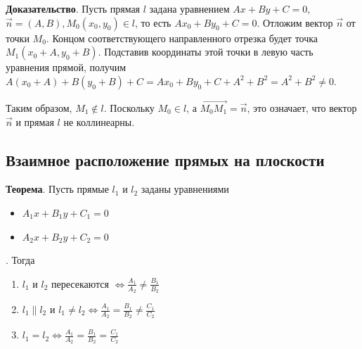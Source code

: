 \documentclass[a4paper]{article}
\begin{document}
\begin{hproof}
\textbf{Доказательство}. Пусть прямая $l$ задана уравнением $Ax + By + C = 0$, $\vec{n} = (A, B), M_0 (x_0, y_0) \in l$, то есть $Ax_0 + By_0 + C = 0$. Отложим вектор $\vec{n}$ от точки $M_0$. Концом соответствующего направленного отрезка будет точка $M_1(x_0 + A, y_0 + B)$. Подставив координаты этой точки в левую часть уравнения прямой, получим $A (x_0 + A) + B(y_0 + B) + C = Ax_0 + By_0 + C + A^2 + B^2 = A^2 + B^2 \neq 0$.

Таким образом, $M_1 \notin l$. Поскольку $M_0 \in l$, а $\overrightarrow{M_0 M_1} = \vec{n}$, это означает, что вектор $\vec{n}$ и прямая $l$ не коллинеарны.

\end{hproof}

\newpage \begin{center}\begin{Large}\end{Large}\end{center}
\subsection*{Взаимное расположение прямых на плоскости}


\begin{htheorem}
\textbf{Теорема}. Пусть прямые $l_1$ и $l_2$ заданы уравнениями \begin{itemize}
\item $A_1x+B_1y+C_1 = 0$
\item $A_2x+B_2y+C_2 = 0$
\end{itemize}. Тогда \begin{enumerate}
\item $l_1$ и $l_2$ пересекаются $\displaystyle \Leftrightarrow \frac{A_1}{A_2} \neq \frac{B_1}{B_2}$
\item $\displaystyle l_1 \parallel l_2$ и $\displaystyle l_1 \neq l_2 \Leftrightarrow \frac{A_1}{A_2} = \frac{B_1}{B_2} \neq \frac{C_1}{C_2}$
\item $\displaystyle l_1 = l_2 \Leftrightarrow \frac{A_1}{A_2} = \frac{B_1}{B_2} = \frac{C_1}{C_2}$
\end{enumerate}
\end{htheorem}
\end{document}
